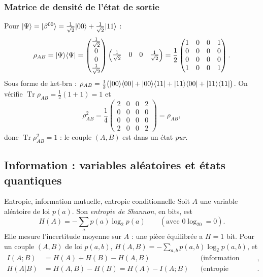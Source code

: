 \subsubsection{Matrice de densité de l'état de sortie}

Pour $|\Psi\rangle=|\beta^{00}\rangle=\frac{1}{\sqrt2}|00\rangle+\frac{1}{\sqrt2}|11\rangle$ :
\[
  \rho_{AB}=|\Psi\rangle\langle \Psi|
  =\begin{pmatrix}\frac{1}{\sqrt2}\\0\\0\\\frac{1}{\sqrt2}\end{pmatrix}
   \begin{pmatrix}\frac{1}{\sqrt2}&0&0&\frac{1}{\sqrt2}\end{pmatrix}
  =\frac12\begin{pmatrix}1&0&0&1\\0&0&0&0\\0&0&0&0\\1&0&0&1\end{pmatrix}.
\]
Sous forme de ket-bra :
$\rho_{AB}=\frac12\big(|00\rangle\langle 00|+|00\rangle\langle 11|+|11\rangle\langle 00|+|11\rangle\langle 11|\big)$.
On vérifie $\operatorname{Tr}\rho_{AB}=\frac12(1+1)=1$ et
\[
  \rho_{AB}^2=\frac14\begin{pmatrix}2&0&0&2\\0&0&0&0\\0&0&0&0\\2&0&0&2\end{pmatrix}=\rho_{AB},
\]
donc $\operatorname{Tr}\rho_{AB}^2=1$ : le couple $(A,B)$ est dans un état \emph{pur}.

\subsection{Information : variables aléatoires et états quantiques}\label{sec:info}

\begin{definition}{Entropie, information mutuelle, entropie conditionnelle}
Soit $A$ une variable aléatoire de loi $p(a)$. Son \emph{entropie de Shannon}, en bits, est
\[
  H(A)=-\sum_a p(a)\log_2p(a)\qquad(\text{avec }0\log_20=0).
\]
Elle mesure l'incertitude moyenne sur $A$ : une pièce équilibrée a $H=1$ bit. Pour un couple
$(A,B)$ de loi $p(a,b)$, $H(A,B)=-\sum_{a,b}p(a,b)\log_2p(a,b)$, et
\begin{align*}
  I(A;B)&=H(A)+H(B)-H(A,B) &&\text{(information mutuelle)},\\
  H(A|B)&=H(A,B)-H(B)=H(A)-I(A;B) &&\text{(entropie conditionnelle)}.
\end{align*}
\end{definition}

